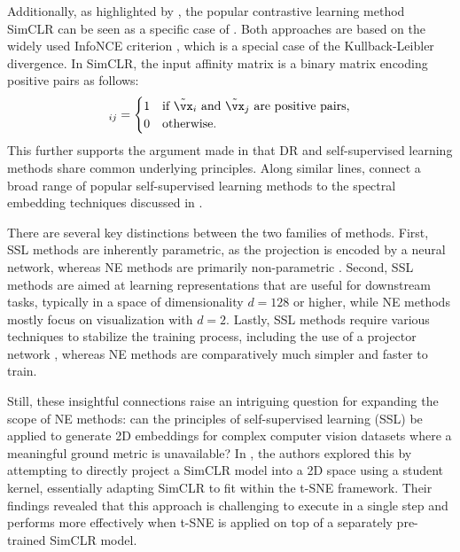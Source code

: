 Additionally, as highlighted by \citet{hu2022your}, the popular contrastive learning method SimCLR \citep{chen2020simple} can be seen as a specific case of . Both approaches are based on the widely used InfoNCE criterion \citep{oord2018representation}, which is a special case of the Kullback-Leibler divergence. In SimCLR, the input affinity matrix is a binary matrix encoding positive pairs as follows:
\begin{align}
[\widetilde{\simiX}]_{ij} = 
\begin{cases}
1 & \text{if } \tilde{\vx}_i \text{ and } \tilde{\vx}_j \text{ are positive pairs,} \\
0 & \text{otherwise.}
\end{cases}
\end{align}
This further supports the argument made in  that DR and self-supervised learning methods share common underlying principles. Along similar lines, \citet{balestriero2022contrastive} connect a broad range of popular self-supervised learning methods to the spectral embedding techniques discussed in .

There are several key distinctions between the two families of methods. First, SSL methods are inherently parametric, as the projection is encoded by a neural network, whereas NE methods are primarily non-parametric \citep{chen2020simple}. Second, SSL methods are aimed at learning representations that are useful for downstream tasks, typically in a space of dimensionality $d=128$ or higher, while NE methods mostly focus on visualization with $d=2$. Lastly, SSL methods require various techniques to stabilize the training process, including the use of a projector network \citep{balestriero2023cookbookselfsupervisedlearning}, whereas NE methods are comparatively much simpler and faster to train. 

Still, these insightful connections raise an intriguing question for expanding the scope of NE methods: can the principles of self-supervised learning (SSL) be applied to generate 2D embeddings for complex computer vision datasets where a meaningful ground metric is unavailable? In \citep{bohm2022unsupervised}, the authors explored this by attempting to directly project a SimCLR model into a 2D space using a student kernel, essentially adapting SimCLR to fit within the t-SNE framework. Their findings revealed that this approach is challenging to execute in a single step and performs more effectively when t-SNE is applied on top of a separately pre-trained SimCLR model.

